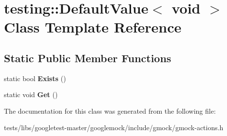 \hypertarget{classtesting_1_1DefaultValue_3_01void_01_4}{}\section{testing\+:\+:Default\+Value$<$ void $>$ Class Template Reference}
\label{classtesting_1_1DefaultValue_3_01void_01_4}
\subsection*{Static Public Member Functions}
\begin{DoxyCompactItemize}
\item 
\mbox{\label{classtesting_1_1DefaultValue_3_01void_01_4_ae18ea46cbf928b820c91f15fa7aa317b}} 
static bool {\bfseries Exists} ()
\item 
\mbox{\label{classtesting_1_1DefaultValue_3_01void_01_4_acda4c367a5b0c0cfb28bc2289f385eed}} 
static void {\bfseries Get} ()
\end{DoxyCompactItemize}


The documentation for this class was generated from the following file\+:\begin{DoxyCompactItemize}
\item 
tests/libs/googletest-\/master/googlemock/include/gmock/gmock-\/actions.\+h\end{DoxyCompactItemize}
